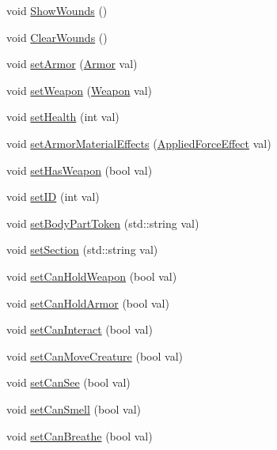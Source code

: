\begin{DoxyCompactItemize}
\item 
void \mbox{\hyperlink{class_body_part_a59d24b904169031b36cef2f4ba2847f1}{Show\+Wounds}} ()
\item 
void \mbox{\hyperlink{class_body_part_aad10894946e0dc672d9fbaecae496cc9}{Clear\+Wounds}} ()
\item 
void \mbox{\hyperlink{class_body_part_a089afe1bbd06d3fc84a9870ec173883c}{set\+Armor}} (\mbox{\hyperlink{class_armor}{Armor}} val)
\item 
void \mbox{\hyperlink{class_body_part_a12897c5566d467977f7bbbe39665c4f5}{set\+Weapon}} (\mbox{\hyperlink{class_weapon}{Weapon}} val)
\item 
void \mbox{\hyperlink{class_body_part_aca91d2ed2644a952b437a3e1f5155318}{set\+Health}} (int val)
\item 
void \mbox{\hyperlink{class_body_part_a042e07259ce197a1077fe36660332a33}{set\+Armor\+Material\+Effects}} (\mbox{\hyperlink{struct_applied_force_effect}{Applied\+Force\+Effect}} val)
\item 
void \mbox{\hyperlink{class_body_part_a15d3ae087969dc50e7db331c73bd346b}{set\+Has\+Weapon}} (bool val)
\item 
void \mbox{\hyperlink{class_body_part_ac4d2365cc57317596096db2b56f52c91}{set\+ID}} (int val)
\item 
void \mbox{\hyperlink{class_body_part_afe0684374c38122fe9316bedff8742dc}{set\+Body\+Part\+Token}} (std\+::string val)
\item 
void \mbox{\hyperlink{class_body_part_acae2236af2e131dfb8a49b4ca62d0d1f}{set\+Section}} (std\+::string val)
\item 
void \mbox{\hyperlink{class_body_part_af61f39aa545dacd8c1a9cf43761df85a}{set\+Can\+Hold\+Weapon}} (bool val)
\item 
void \mbox{\hyperlink{class_body_part_ad83118e7510cbab332815cd9254a6024}{set\+Can\+Hold\+Armor}} (bool val)
\item 
void \mbox{\hyperlink{class_body_part_acb68020a45ea6f0d14b963b3159317a2}{set\+Can\+Interact}} (bool val)
\item 
void \mbox{\hyperlink{class_body_part_a8a6352fc3a764e8358f52f17caaa2867}{set\+Can\+Move\+Creature}} (bool val)
\item 
void \mbox{\hyperlink{class_body_part_acc7c6792cd9837901dfb7d639714eb00}{set\+Can\+See}} (bool val)
\item 
void \mbox{\hyperlink{class_body_part_acc147f8434d4bf881ee4b54e1b79c439}{set\+Can\+Smell}} (bool val)
\item 
void \mbox{\hyperlink{class_body_part_a23728f2f16804c3ab90c891319e3df84}{set\+Can\+Breathe}} (bool val)

\end{DoxyCompactItemize}
